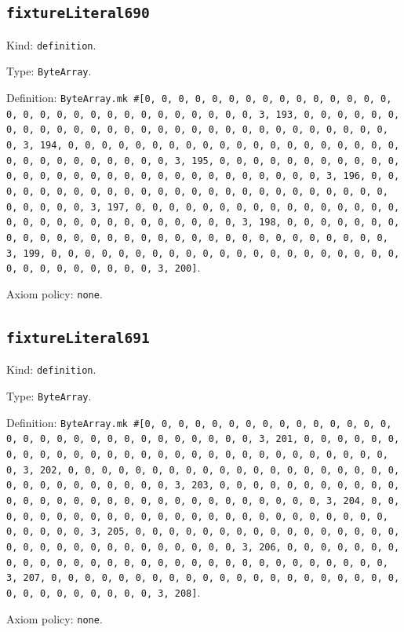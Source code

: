 \documentclass[11pt]{article}
\begin{document}
\subsection*{\texttt{fixtureLiteral690}}
\noindent Kind: \texttt{definition}.\par
\noindent Type: \texttt{ByteArray}.\par
\noindent Definition: \texttt{ByteArray.mk \#[0, 0, 0, 0, 0, 0, 0, 0, 0, 0, 0, 0, 0, 0, 0, 0, 0, 0, 0, 0, 0, 0, 0, 0, 0, 0, 0, 0, 0, 0, 3, 193, 0, 0, 0, 0, 0, 0, 0, 0, 0, 0, 0, 0, 0, 0, 0, 0, 0, 0, 0, 0, 0, 0, 0, 0, 0, 0, 0, 0, 0, 0, 3, 194, 0, 0, 0, 0, 0, 0, 0, 0, 0, 0, 0, 0, 0, 0, 0, 0, 0, 0, 0, 0, 0, 0, 0, 0, 0, 0, 0, 0, 0, 0, 3, 195, 0, 0, 0, 0, 0, 0, 0, 0, 0, 0, 0, 0, 0, 0, 0, 0, 0, 0, 0, 0, 0, 0, 0, 0, 0, 0, 0, 0, 0, 0, 3, 196, 0, 0, 0, 0, 0, 0, 0, 0, 0, 0, 0, 0, 0, 0, 0, 0, 0, 0, 0, 0, 0, 0, 0, 0, 0, 0, 0, 0, 0, 0, 3, 197, 0, 0, 0, 0, 0, 0, 0, 0, 0, 0, 0, 0, 0, 0, 0, 0, 0, 0, 0, 0, 0, 0, 0, 0, 0, 0, 0, 0, 0, 0, 3, 198, 0, 0, 0, 0, 0, 0, 0, 0, 0, 0, 0, 0, 0, 0, 0, 0, 0, 0, 0, 0, 0, 0, 0, 0, 0, 0, 0, 0, 0, 0, 3, 199, 0, 0, 0, 0, 0, 0, 0, 0, 0, 0, 0, 0, 0, 0, 0, 0, 0, 0, 0, 0, 0, 0, 0, 0, 0, 0, 0, 0, 0, 0, 3, 200]}.\par
\noindent Axiom policy: \texttt{none}.\par
\subsection*{\texttt{fixtureLiteral691}}
\noindent Kind: \texttt{definition}.\par
\noindent Type: \texttt{ByteArray}.\par
\noindent Definition: \texttt{ByteArray.mk \#[0, 0, 0, 0, 0, 0, 0, 0, 0, 0, 0, 0, 0, 0, 0, 0, 0, 0, 0, 0, 0, 0, 0, 0, 0, 0, 0, 0, 0, 0, 3, 201, 0, 0, 0, 0, 0, 0, 0, 0, 0, 0, 0, 0, 0, 0, 0, 0, 0, 0, 0, 0, 0, 0, 0, 0, 0, 0, 0, 0, 0, 0, 3, 202, 0, 0, 0, 0, 0, 0, 0, 0, 0, 0, 0, 0, 0, 0, 0, 0, 0, 0, 0, 0, 0, 0, 0, 0, 0, 0, 0, 0, 0, 0, 3, 203, 0, 0, 0, 0, 0, 0, 0, 0, 0, 0, 0, 0, 0, 0, 0, 0, 0, 0, 0, 0, 0, 0, 0, 0, 0, 0, 0, 0, 0, 0, 3, 204, 0, 0, 0, 0, 0, 0, 0, 0, 0, 0, 0, 0, 0, 0, 0, 0, 0, 0, 0, 0, 0, 0, 0, 0, 0, 0, 0, 0, 0, 0, 3, 205, 0, 0, 0, 0, 0, 0, 0, 0, 0, 0, 0, 0, 0, 0, 0, 0, 0, 0, 0, 0, 0, 0, 0, 0, 0, 0, 0, 0, 0, 0, 3, 206, 0, 0, 0, 0, 0, 0, 0, 0, 0, 0, 0, 0, 0, 0, 0, 0, 0, 0, 0, 0, 0, 0, 0, 0, 0, 0, 0, 0, 0, 0, 3, 207, 0, 0, 0, 0, 0, 0, 0, 0, 0, 0, 0, 0, 0, 0, 0, 0, 0, 0, 0, 0, 0, 0, 0, 0, 0, 0, 0, 0, 0, 0, 3, 208]}.\par
\noindent Axiom policy: \texttt{none}.\par
\end{document}
